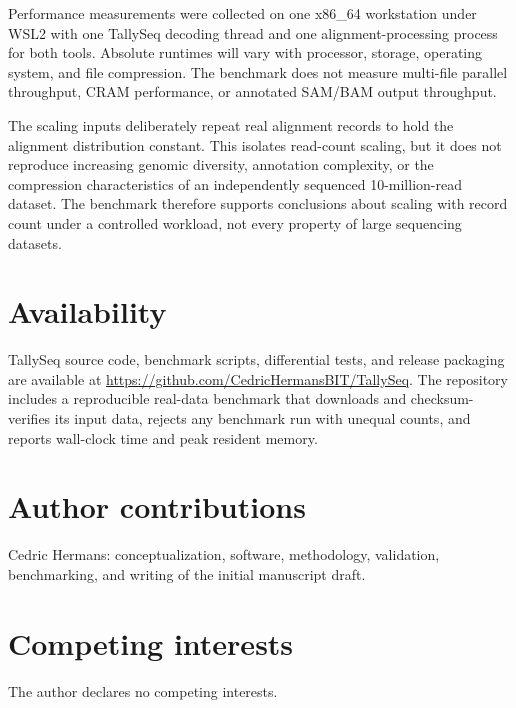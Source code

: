 \documentclass[11pt]{article}
\begin{document}
Performance measurements were collected on one x86\_64 workstation under WSL2 with one TallySeq decoding thread and one alignment-processing process for both tools. Absolute runtimes will vary with processor, storage, operating system, and file compression. The benchmark does not measure multi-file parallel throughput, CRAM performance, or annotated SAM/BAM output throughput.

The scaling inputs deliberately repeat real alignment records to hold the alignment distribution constant. This isolates read-count scaling, but it does not reproduce increasing genomic diversity, annotation complexity, or the compression characteristics of an independently sequenced 10-million-read dataset. The benchmark therefore supports conclusions about scaling with record count under a controlled workload, not every property of large sequencing datasets.

\section{Availability}

TallySeq source code, benchmark scripts, differential tests, and release packaging are available at \url{https://github.com/CedricHermansBIT/TallySeq}. The repository includes a reproducible real-data benchmark that downloads and checksum-verifies its input data, rejects any benchmark run with unequal counts, and reports wall-clock time and peak resident memory.

\section{Author contributions}

Cedric Hermans: conceptualization, software, methodology, validation, benchmarking, and writing of the initial manuscript draft.

\section{Competing interests}

The author declares no competing interests.



\end{document}
